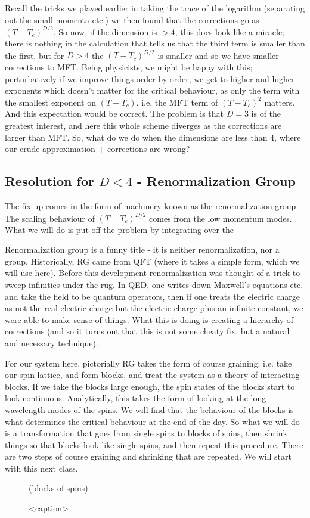 Recall the tricks we played earlier in taking the trace of the logarithm (separating out the small momenta etc.) we then found that the corrections go as $(T - T_c)^{D/2}$. So now, if the dimension is $> 4$, this does look like a miracle; there is nothing in the calculation that tells us that the third term is smaller than the first, but for $D > 4$ the $(T - T_c)^{D/2}$ is smaller and so we have smaller corrections to MFT. Being physicists, we might be happy with this; perturbatively if we improve things order by order, we get to higher and higher exponents which doesn't matter for the critical behaviour, as only the term with the smallest exponent on $(T - T_c)$, i.e. the MFT term of $(T - T_c)^2$ matters. And this expectation would be correct. The problem is that $D = 3$ is of the greatest interest, and here this whole scheme diverges as the corrections are larger than MFT. So, what do we do when the dimensions are less than 4, where our crude approximation + corrections are wrong?

\subsection{Resolution for $D < 4$ - Renormalization Group}
The fix-up comes in the form of machinery known as the renormalization group. The scaling behaviour of $(T - T_c)^{D/2}$ comes from the low momentum modes. What we will do is put off the problem by integrating over the 

Renormalization group is a funny title - it is neither renormalization, nor a group. Historically, RG came from QFT (where it takes a simple form, which we will use here). Before this development renormalization was thought of a trick to sweep infinities under the rug. In QED, one writes down Maxwell's equations etc. and take the field to be quantum operators, then if one treats the electric charge as not the real electric charge but the electric charge plus an infinite constant, we were able to make sense of things. What this is doing is creating a hierarchy of corrections (and so it turns out that this is not some cheaty fix, but a natural and necessary technique). 

For our system here, pictorially RG takes the form of course graining; i.e. take our spin lattice, and form blocks, and treat the system as a theory of interacting blocks. If we take the blocks large enough, the spin states of the blocks start to look continuous. Analytically, this takes the form of looking at the long wavelength modes of the spins. We will find that the behaviour of the blocks is what determines the critical behaviour at the end of the day. So what we will do is a transformation that goes from single spins to blocks of spins, then shrink things so that blocks look like single spins, and then repeat this procedure. There are two steps of course graining and shrinking that are repeated. We will start with this next class.

\begin{figure}[htbp]
    \centering
    (blocks of spins)
    \caption{<caption>}
    \label{<label>}
\end{figure}